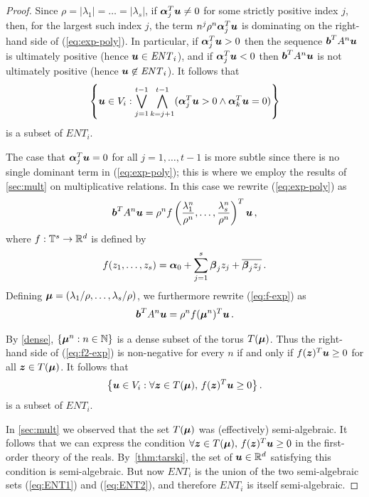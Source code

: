 \begin{proof}
Since $\rho=|\lambda_1|=\ldots=|\lambda_s|$, if
$\boldsymbol{\alpha}_j^T\boldsymbol{u}\neq 0$ for some strictly
positive index $j$, then, for the largest such index $j$, the term
$n^{j}\rho^n\boldsymbol{\alpha}_{j}^T\boldsymbol{u}$ is
dominating on the right-hand side of (\ref{eq:exp-poly}).  In
particular, if $\boldsymbol{\alpha}_{j}^T\boldsymbol{u}>0$ then the
sequence $\boldsymbol{b}^TA^n\boldsymbol{u}$ is ultimately positive
(hence $\boldsymbol{u}\in \mathit{ENT}_i$), and if
$\boldsymbol{\alpha}_{j}^T\boldsymbol{u}<0$ then
$\boldsymbol{b}^TA^n\boldsymbol{u}$ is not ultimately positive (hence
$\boldsymbol{u}\not\in\mathit{ENT}_i$).  It follows that
\begin{gather}
\left\{ \myvector{u} \in V_i : \bigvee_{j=1}^{t-1}\bigwedge_{k=j+1}^{t-1}
(\myvector{\alpha}_j^T \myvector{u}>0 \wedge
\myvector{\alpha}_k^T \myvector{u}=0) \right\}
\label{eq:ENT1}
\end{gather}
is a subset of $\mathit{ENT}_i$.

The case that $\boldsymbol{\alpha}_j^T\boldsymbol{u}=0$ for all
$j=1,\ldots,t-1$ is more subtle since there is no single dominant term
in (\ref{eq:exp-poly}); this is where we employ the results of
\cref{sec:mult} on multiplicative relations. In this case we
rewrite (\ref{eq:exp-poly}) as
\begin{gather}
\myvector{b}^T A^n \myvector{u} =
 \rho^n f\left(\frac{\lambda^n_1}{\rho^n},\ldots,
               \frac{\lambda^n_s}{\rho^n}\right)^T \myvector{u} \, ,
\label{eq:f-exp}
\end{gather}
where $f:\mathbb{T}^s\rightarrow\mathbb{R}^{d}$ is defined by
\[f(z_1,\ldots,z_s)=\boldsymbol{\alpha}_0 + \sum_{j=1}^s \boldsymbol{\beta}_jz_j + \overline{\boldsymbol{\beta}_jz_j} \, .\]
Defining $\boldsymbol\mu=(\lambda_1/\rho,\ldots,\lambda_s/\rho)$, we furthermore rewrite (\ref{eq:f-exp}) as
\begin{gather}
\myvector{b}^T A^n \myvector{u} =
    \rho^n f(\myvector\mu^n)^T \myvector{u} \, .
\label{eq:f2-exp}
\end{gather}

By \cref{dense}, $\{ \boldsymbol\mu^n : n \in
\mathbb{N} \}$ is a dense subset of the torus $T(\boldsymbol{\mu})$.
Thus the right-hand side of (\ref{eq:f2-exp}) is non-negative for
every $n$ if and only if $f(\boldsymbol{z})^T\boldsymbol{u}\geq 0$ for
all $\boldsymbol{z}\in T(\boldsymbol{\mu})$.  It follows that
\begin{gather} \big \{ \myvector{u}\in V_i :
\forall \myvector{z}\in T(\myvector{\mu}),\,
                              f(\myvector{z})^T\myvector{u}\geq 0
\big\}\, .
\label{eq:ENT2}
\end{gather}
is a subset of $\mathit{ENT}_i$.

In \cref{sec:mult} we observed that the set
$T(\boldsymbol{\mu})$ was (effectively) semi-algebraic.  It follows
that we can express the condition $\forall \boldsymbol{z}\in
T(\boldsymbol{\mu}),\, f(\boldsymbol{z})^T\boldsymbol{u}\geq 0$ in the
first-order theory of the reals.
By~\cref{thm:tarski}, the set of $\boldsymbol{u}\in
\mathbb{R}^{d}$ satisfying this condition is semi-algebraic.  But now
$\mathit{ENT}_i$ is the union of the two semi-algebraic sets
(\ref{eq:ENT1}) and (\ref{eq:ENT2}), and therefore $\mathit{ENT}_i$ is
itself semi-algebraic.
\end{proof}
